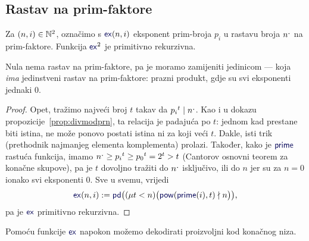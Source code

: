 \subsection{Rastav na prim-faktore}
\begin{lema}[{name=[primitivna rekurzivnost rastava na prim-faktore]}]\label{lm:exprn}
Za $(n,i)\in{\mathbb N}^2$, označimo s $\f{ex}(n,i)$ eksponent prim-broja $p_i$ u rastavu broja $n\sp{\text{\normalsize.}}$ na prim-faktore. Funkcija $\f{ex}^2$ je primitivno rekurzivna.
\end{lema}
Nula nema rastav na prim-faktore, pa je moramo zamijeniti jedinicom --- koja \emph{ima} jedinstveni rastav na prim-faktore: prazni produkt, gdje su svi eksponenti jednaki $0$.
\begin{proof}
Opet, tražimo najveći broj $t$ takav da ${p_i}^t\mid n\sp{\text{\normalsize.}}$. Kao i u dokazu propozicije~\ref{prop:divmodprn}, ta relacija je padajuća po $t$: jednom kad prestane biti istina, ne može ponovo postati istina ni za koji veći $t$. Dakle, isti trik (prethodnik najmanjeg elementa komplementa) prolazi. Također, kako je $\f{prime}$ rastuća funkcija, imamo $n\sp{\text{\normalsize.}}\ge{p_i}^t\ge{p_0}^t=2^t>t$ (Cantorov osnovni teorem za konačne skupove), pa je $t$ dovoljno tražiti do $n\sp{\text{\normalsize.}}$ isključivo, ili do $n$ jer su za $n=0$ ionako svi eksponenti $0$. Sve u svemu, vrijedi
\begin{equation}
    \f{ex}(n,i):=\f{pd}\bigl((\mu t<n)\bigl(\f{pow}(\f{prime}(i),t)\nmid n\bigr)\bigr)\text,
\end{equation}
pa je $\f{ex}$ primitivno rekurzivna.
\end{proof}

Pomoću funkcije $\f{ex}$ napokon možemo dekodirati proizvoljni kod konačnog niza.

